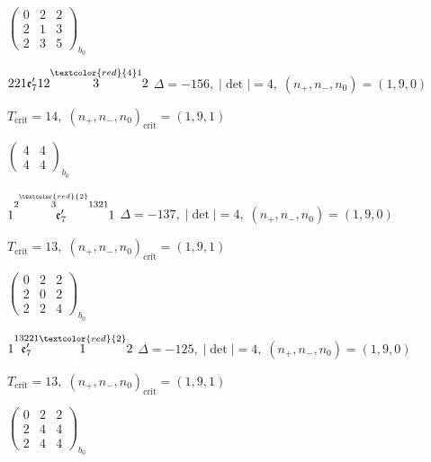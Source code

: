 \documentclass[10pt]{article}
\begin{document}
\hspace{2em}$\left(\begin{smallmatrix}0 & 2 & 2 \\ 2 & 1 & 3 \\ 2 & 3 & 5\end{smallmatrix}\right)_{\!b_0}$

$221\mathfrak{e}_7'12\overset{\textcolor{red}{4}1}{3}2$ \quad $\Delta=-156,\; |\det|=4,\; (n_+,n_-,n_0)=(1,9,0)$

\hspace{1em}$T_{\text{crit}}=14,\; (n_+,n_-,n_0)_{\text{crit}}=(1,9,1)$

\hspace{2em}$\left(\begin{smallmatrix}4 & 4 \\ 4 & 4\end{smallmatrix}\right)_{\!b_0}$

\smallskip

$1\overset{2\overset{\textcolor{red}{2}}{3}1321}{\mathfrak{e}_7'}1$ \quad $\Delta=-137,\; |\det|=4,\; (n_+,n_-,n_0)=(1,9,0)$

\hspace{1em}$T_{\text{crit}}=13,\; (n_+,n_-,n_0)_{\text{crit}}=(1,9,1)$

\hspace{2em}$\left(\begin{smallmatrix}0 & 2 & 2 \\ 2 & 0 & 2 \\ 2 & 2 & 4\end{smallmatrix}\right)_{\!b_0}$

\smallskip

$1\overset{13221}{\mathfrak{e}_7'}\overset{\textcolor{red}{2}}{1}2$ \quad $\Delta=-125,\; |\det|=4,\; (n_+,n_-,n_0)=(1,9,0)$

\hspace{1em}$T_{\text{crit}}=13,\; (n_+,n_-,n_0)_{\text{crit}}=(1,9,1)$

\hspace{2em}$\left(\begin{smallmatrix}0 & 2 & 2 \\ 2 & 4 & 4 \\ 2 & 4 & 4\end{smallmatrix}\right)_{\!b_0}$

\smallskip
\end{document}
